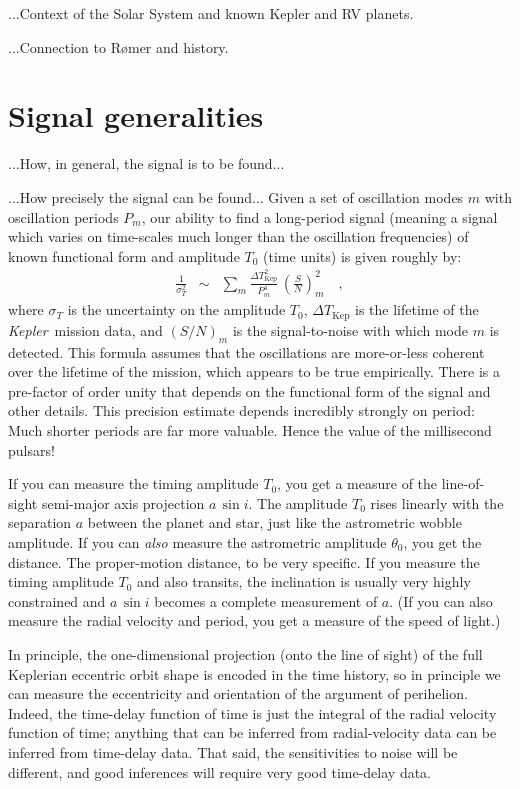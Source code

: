 \documentclass[12pt, preprint]{aastex}
\newcommand{\project}[1]{\textsl{#1}}
\newcommand{\Kepler}{\project{Kepler}}
\newcommand{\DeltaTKepler}{\Delta T_{\mathrm{Kep}}}
\begin{document}
...Context of the Solar System and known Kepler and RV planets.

...Connection to R\o mer and history.

\section{Signal generalities}

...How, in general, the signal is to be found...

...How precisely the signal can be found...
Given a set of oscillation modes $m$ with oscillation periods $P_m$,
our ability to find a long-period signal (meaning a signal which
varies on time-scales much longer than the oscillation frequencies) of
known functional form and amplitude $T_0$ (time units) is given
roughly by:
\begin{eqnarray}
\frac{1}{\sigma_T^2} &\sim& \sum_m \frac{\DeltaTKepler^2}{P_m^4}\,\left(\frac{S}{N}\right)_m^2
\quad ,
\end{eqnarray}
where $\sigma_T$ is the uncertainty on the amplitude $T_0$,
$\DeltaTKepler$ is the lifetime of the \Kepler\ mission data, and
$(S/N)_m$ is the signal-to-noise with which mode $m$ is detected.
This formula assumes that the oscillations are more-or-less coherent
over the lifetime of the mission, which appears to be true
empirically.
There is a pre-factor of order unity that depends on the functional
form of the signal and other details.
This precision estimate depends incredibly strongly on period:
Much shorter periods are far more valuable.
Hence the value of the millisecond pulsars!

If you can measure the timing amplitude $T_0$, you get a measure of
the line-of-sight semi-major axis projection $a\,\sin i$.
The amplitude $T_0$ rises linearly with the separation $a$ between the
planet and star, just like the astrometric wobble amplitude.
If you can \emph{also} measure the astrometric amplitude $\theta_0$,
you get the distance.
The proper-motion distance, to be very specific.
If you measure the timing amplitude $T_0$ and also transits, the
inclination is usually very highly constrained and $a\,\sin i$ becomes
a complete measurement of $a$.
(If you can also measure the radial velocity and period, you get a
measure of the speed of light.)

In principle, the one-dimensional projection (onto the line of sight)
of the full Keplerian eccentric orbit shape is encoded in the time
history, so in principle we can measure the eccentricity and
orientation of the argument of perihelion.
Indeed, the time-delay function of time is just the integral of the
radial velocity function of time; anything that can be inferred from
radial-velocity data can be inferred from time-delay data.
That said, the sensitivities to noise will be different, and good
inferences will require very good time-delay data.
\end{document}
